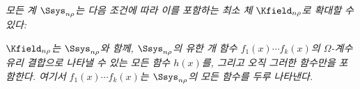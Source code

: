 
\emph{모든 계 $\Ssys_{n\rho}$는 다음 조건에 따라 이를 포함하는 최소 체 $\Kfield_{n\rho}$로 확대할 수 있다:}

\emph{$\Kfield_{n\rho}$는 $\Ssys_{n\rho}$와 함께, $\Ssys_{n\rho}$의 유한 개 함수 $f_1(x)\cdots f_k(x)$의 $\Omega$-계수 유리 결합으로 나타낼 수 있는 모든 함수 $h(x)$를, 그리고 오직 그러한 함수만을 포함한다. 여기서 $f_1(x)\cdots f_k(x)$는 $\Ssys_{n\rho}$의 모든 함수를 두루 나타낸다.}
